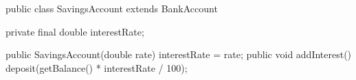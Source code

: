 \begin{unipdcode}[language=Java]
public class SavingsAccount extends BankAccount {
    private final double interestRate;

    public SavingsAccount(double rate) { interestRate = rate; }
    public void addInterest() { deposit(getBalance() * interestRate / 100); }
}
\end{unipdcode}
